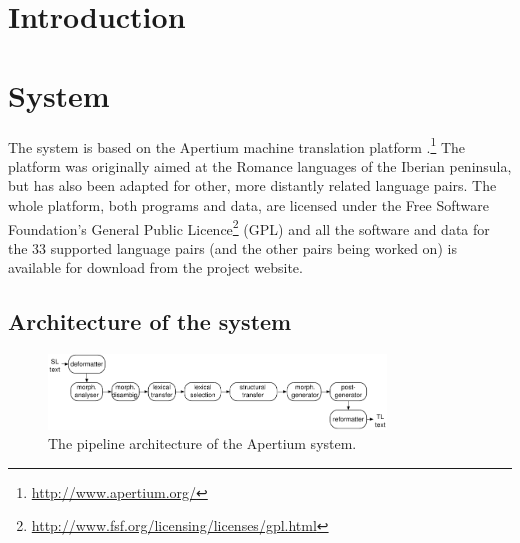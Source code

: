 \documentclass[10pt,a5paper,twoside]{article}
\begin{document}



\newpage
\section{Introduction}

\section{System}
The system is based on the Apertium machine translation platform \citep{apertium/2011}.\footnote{\url{http://www.apertium.org/}} The platform was originally aimed at the Romance languages of the Iberian peninsula, but has also been adapted for other, more distantly related language pairs. The whole platform, both programs and data, are licensed under the Free Software Foundation's General Public Licence\footnote{\url{http://www.fsf.org/licensing/licenses/gpl.html}} (GPL) and all the software and data for the 33 supported language pairs (and the other pairs being worked on) is available for download from the project website.

\subsection{Architecture of the system}

\begin{figure}[htbp]
\begin{center}
 \includegraphics[width=0.8\textwidth]{architecture.pdf}
\end{center}
\caption{The pipeline architecture of the Apertium system.}
\label{fig:modules}
\end{figure}
\end{document}
